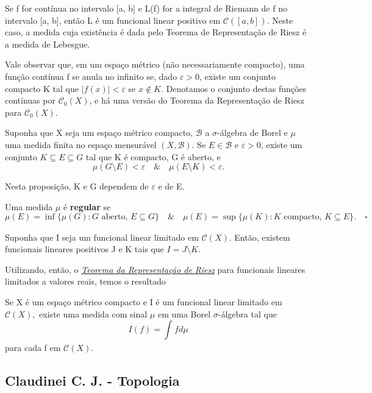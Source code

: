 \documentclass[measure_theory.tex]{subfiles}
\begin{document}
\begin{example}
	Se f for contínua no intervalo [a, b] e L(f) for a integral de Riemann de f no intervalo [a, b], então L é um funcional linear positivo em \(\mathcal{C}([a, b]).\) Neste caso, a medida cuja existência é dada pelo Teorema de Representação de Riesz
	é a medida de Lebesgue.
\end{example}
Vale observar que, em um espaço métrico (não necessariamente compacto), uma função contínua f se anula no infinito se, dado \(\varepsilon  > 0\), existe um conjunto compacto K tal que \(|f(x)| < \varepsilon \) se \(x\not\in K\). Denotamos o conjunto destas funções contínuas por \(\mathcal{C}_{0}(X)\), e há
uma versão do Teorema da Representação de Riesz para \(\mathcal{C}_{0}(X).\)
\begin{prop*}
	Suponha que X seja um espaço métrico compacto, \(\mathcal{B}\) a \(\sigma \)-álgebra de Borel e \(\mu \) uma medida finita no espaço mensurável \((X, \mathcal{B}).\) Se \(E\in \mathcal{B}\) e \(\varepsilon  > 0\), existe um conjunto \(K\subseteq E\subseteq G\) tal que K é compacto, G é aberto, e
	\[
		\mu (G\setminus{E}) < \varepsilon \quad\&\quad \mu (E\setminus{K})<\varepsilon .
	\]
\end{prop*}
Nesta proposição, K e G dependem de \(\varepsilon \) e de E.
\begin{def*}
	Uma medida \(\mu \) é \textbf{regular} se
	\[
		\mu (E) = \inf_{}\{\mu (G): G \text{ aberto, } E \subseteq G\}\quad\&\quad \mu (E) = \sup_{}\{\mu (K): K \text{ compacto, }K\subseteq E\}. \quad \square
	\]
\end{def*}
\begin{prop*}
	Suponha que I seja um funcional linear limitado em \(\mathcal{C}(X)\). Então, existem funcionais lineares positivos J e K tais que \(I = J\setminus{K}.\)
\end{prop*}
Utilizando, então, o \hyperlink{riesz_representation}{\textit{Teorema da Representação de Riesz}} para funcionais lineares limitados a valores reais, temos o resultado
\begin{theorem*}
	Se X é um espaço métrico compacto e I é um funcional linear limitado em \(\mathcal{C}(X),\) existe uma medida com sinal \(\mu \) em uma Borel \(\sigma \)-álgebra tal que
	\[
		I(f) = \int_{}f d\mu_{}
	\]
	para cada f em \(\mathcal{C}(X).\)
\end{theorem*}
\subsection{Claudinei C. J. - Topologia}
\end{document}
